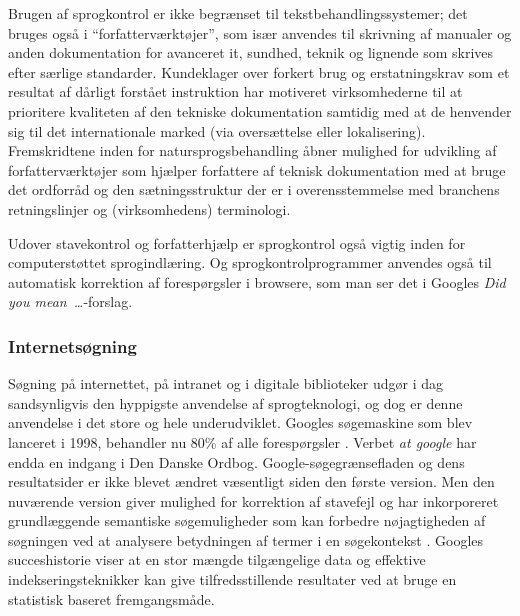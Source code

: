\documentclass[]{../../metanetpaper}
\begin{document}
\begin{multicols}{2}
Brugen af sprogkontrol er ikke begr\ae nset til tekstbehandlingssystemer; det bruges \mbox{ogs\aa} i ``forfatterv\ae rkt\o jer'', som is\ae r anvendes til skrivning af manualer og anden dokumentation for avanceret it, sundhed, teknik og lignende som skrives efter s\ae rlige standarder. Kundeklager over forkert brug og erstatningskrav som et resultat af d\aa rligt forst\aa et instruktion har motiveret virksomhederne til at prioritere kvaliteten af den tekniske dokumentation samtidig med at de henvender sig til det internationale marked (via overs\ae ttelse eller lokalisering). Fremskridtene inden for natursprogsbehandling \aa bner mulighed for udvikling af forfatterv\ae rkt\o jer som hj\ae lper forfattere af teknisk dokumentation med at bruge det ordforr\aa d og den s\ae tningsstruktur der er i overensstemmelse med branchens retningslinjer og (virksomhedens) terminologi.


Udover stavekontrol og forfatterhj\ae lp er sprogkontrol \mbox{ogs\aa} vigtig inden for computerst\o ttet sprogindl\ae ring. Og sprogkontrolprogrammer anvendes \mbox{ogs\aa} til automatisk korrektion af foresp\o rgsler i browsere, som man ser det i Googles {\it Did you mean~\dots}-forslag.


\subsubsection{Internets\o gning}

S\o gning \mbox{p\aa} internettet, \mbox{p\aa} intranet og i digitale biblioteker udg\o r i dag sandsynligvis den hyppigste anvendelse af sprogteknologi, og dog er denne anvendelse i det store og hele underudviklet. Googles s\o gemaskine som blev lanceret i 1998, behandler nu 80\% af alle foresp\o rgsler \cite{spi1}.   Verbet {\it at google} har endda en indgang i Den Danske Ordbog. Google-s\o gegr\ae nsefladen og dens resultatsider er ikke blevet \ae ndret v\ae sentligt siden den f\o rste version. Men den nuv\ae rende version giver mulighed for korrektion af stavefejl og har inkorporeret grundl\ae ggende semantiske s\o gemuligheder som kan forbedre n\o jagtigheden af s\o gningen ved at analysere betydningen af termer i en s\o gekontekst \cite{pc1}.   Googles succeshistorie viser at en stor m\ae ngde tilg\ae ngelige data og effektive indekseringsteknikker kan give tilfredsstillende resultater ved at bruge en statistisk baseret fremgangsm\aa de.


\end{multicols}
\end{document}
